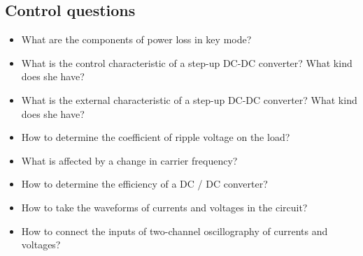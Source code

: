 \documentclass[a4paper,14pt]{article}
\begin{document}
\subsection{Control questions}

\begin{itemize}
	\item What are the components of power loss in key mode?

	\item What is the control characteristic of a step-up DC-DC converter? What kind does she have?

	\item What is the external characteristic of a step-up DC-DC converter? What kind does she have?

	\item How to determine the coefficient of ripple voltage on the load?

	\item What is affected by a change in carrier frequency?

	\item How to determine the efficiency of a DC / DC converter?

	\item How to take the waveforms of currents and voltages in the circuit?

	\item How to connect the inputs of two-channel oscillography of currents and voltages?
\end{itemize}
\end{document}
